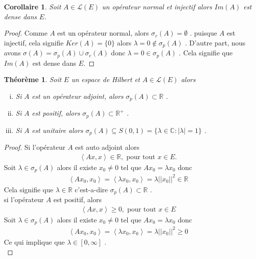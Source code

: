 \documentclass{report}
\newtheorem{The}{Théorème}[subsection]
\newtheorem{Cor}{Corollaire}[subsection]
\begin{document}
{\begin{Cor} Soit $A \in \mathscr{L}(E)$ un opérateur normal et injectif alors $Im(A)$ est dense dans $E$.\\
\end{Cor}
\begin{proof}
Comme $A$ est un opérateur normal, alors $\sigma_r(A) = \emptyset$ . puisque $A$ est injectif, cela signifie $Ker(A) = \{0\}$ alors $\lambda = 0 \notin \sigma_p(A)$ . D'autre part, nous avons $\sigma(A) = \sigma_p(A) \cup \sigma_c(A)$ donc $\lambda = 0 \in \sigma_p(A)$ . Cela signifie que $Im(A)$ est dense dans $E$.
\end{proof}



\begin{The} Soit $E$ un espace de Hilbert et $A \in \mathscr{L}(E)$ alors 
\begin{enumerate}[i)]
	\item   Si $A$ est un opérateur adjoint, alors $\sigma_p(A) \subset \mathbb{R}$ .\\
	\item  Si $A$ est positif, alors $\sigma_p(A) \subset \mathbb{R^+}$ .\\
	\item Si $A$ est unitaire alors $\sigma_p(A) \subseteq S(0,1) = \{\lambda \in \mathbb{C} : |\lambda| = 1\}$ .
\end{enumerate}
\end{The}
\begin{proof}
   Si l'opérateur $A$ est auto adjoint alors 
					\begin{align*}
						 \left< Ax,x \right> \in \mathbb{R} , \,\,\text{pour tout}\,\, x \in E.
					\end{align*}
 Soit $\lambda \in \sigma_p(A)$ alors il existe $x_0 \neq 0$ tel que $A x_0 = \lambda x_0$ donc 
					\begin{align*}
 						 \left< Ax_0,x_0 \right> = \left< \lambda x_0,x_0 \right> = \lambda ||x_0||^2 \in \mathbb{R} 
					\end{align*}
 Cela signifie que $\lambda \in \mathbb{R}$ c'est-a-dire $\sigma_p(A) \subset \mathbb{R}$ .\\
  si l'opérateur $A$ est positif, alors 
					\begin{align*}
							 \left< Ax,x \right> \ge 0 , \,\,\text{pour tout}\,\, x \in E 
					\end{align*}
 Soit $\lambda \in \sigma_p(A)$ alors il existe $x_0 \neq 0$ tel que $Ax_0 = \lambda x_0$ donc 
					\begin{align*}
 							 \left< Ax_0,x_0 \right> = \left< \lambda x_0,x_0 \right> = \lambda ||x_0||^2 \ge 0 
					\end{align*}
 Ce qui implique que $\lambda \in [0,\infty]$ .\\


\end{proof}}
\end{document}
